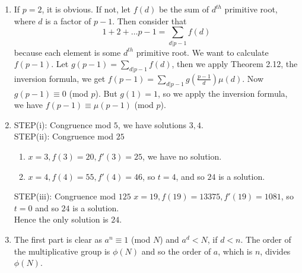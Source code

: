 \begin{enumerate}
\item If $p=2$, it is obvious. If not, let $f(d)$ be the sum of $d^{th}$ primitive root, where $d$ is a factor of $p-1$. Then consider that $$1+2+\ldots p-1=\sum_{d|p-1}f(d)$$ because each element is some $d^{th}$ primitive root. We want to calculate $f(p-1)$. Let $g(p-1)=\sum_{d|p-1}f(d)$, then we apply Theorem 2.12, the inversion formula, we get $f(p-1)=\sum_{d|p-1}g\left(\frac{p-1}{d}\right) \mu(d)$. Now $g(p-1) \equiv 0$ (mod $p$). But $g(1)=1$, so we apply the inversion formula, we have $f(p-1) \equiv \mu(p-1)$ (mod $p$).
\item STEP(i): Congruence mod $5$, we have solutions $3,4$.\\
      STEP(ii): Congruence mod $25$
      \begin{enumerate}
      \item $x=3,f(3)=20,f'(3)=25$, we have no solution.\\
      \item $x=4,f(4)=55,f'(4)=46$, so $t=4$, and so $24$ is a solution.
      \end{enumerate}
      STEP(iii): Congruence mod $125$
      $x=19,f(19)=13375,f'(19)=1081$, so $t=0$ and so $24$ is a solution.\\
      Hence the only solution is $24$.
\item The first part is clear as $a^n \equiv 1$ (mod $N$) and $a^d < N$, if $d < n$. The order of the multiplicative group is $\phi(N)$ and so the order of $a$, which is $n$, divides $\phi(N)$.


\end{enumerate}
